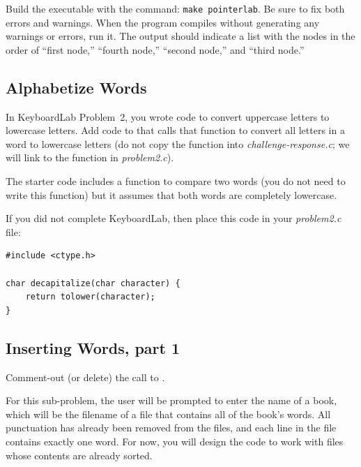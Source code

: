 

Build the executable with the command: \texttt{make pointerlab}. Be sure to fix
both errors and warnings. When the program compiles without generating any
warnings or errors, run it. The output should indicate a list with the nodes in
the order of ``first node,'' ``fourth node,'' ``second node,'' and ``third
node.''

\subsection{Alphabetize Words}

In KeyboardLab Problem~2, you wrote code to convert uppercase letters to
lowercase letters. Add code to  that calls that
function to convert all letters in a word to lowercase letters (do not copy the
 function into \textit{challenge-response.c}; we will
link to the function in \textit{problem2.c}).



The starter code includes a function to compare two words (you do not need to
write this function) but it assumes that both words are completely lowercase.

If you did not complete KeyboardLab, then place this code in your
\textit{problem2.c} file:

\begin{lstlisting}
#include <ctype.h>

char decapitalize(char character) {
    return tolower(character);
}
\end{lstlisting}

\subsection{Inserting Words, part 1}

Comment-out (or delete) the call to .

For this sub-problem, the user will be prompted to enter the name of a book,
which will be the filename of a file that contains all of the book's words. All
punctuation has already been removed from the files, and each line in the file
contains exactly one word. For now, you will design the code to
work with files whose contents are already sorted.

